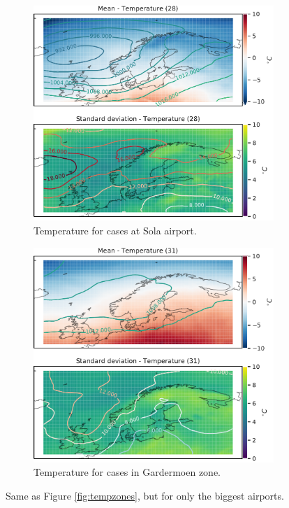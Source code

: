 \begin{figure}
\begin{subfigure}[b]{0.49\textwidth}
         \includegraphics[width=\textwidth]{Figures/TempENZV.pdf}
         \caption{Temperature for cases at Sola airport.}
         \label{fig:ENZVTemperature}
     \end{subfigure}

    \begin{subfigure}[b]{0.5\textwidth}
    \centering
    \includegraphics[width=\textwidth]{Figures/TempENGM.pdf}
    \caption{Temperature for cases in Gardermoen zone.}
    \label{fig:ENGMTemperature}
\end{subfigure}
\caption{Same as Figure \ref{fig:tempzones}, but for only the biggest airports. }
\label{fig:tempairports}
\end{figure}

